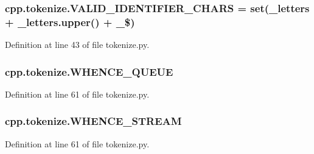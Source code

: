 \subsubsection[{\texorpdfstring{V\+A\+L\+I\+D\+\_\+\+I\+D\+E\+N\+T\+I\+F\+I\+E\+R\+\_\+\+C\+H\+A\+RS}{VALID_IDENTIFIER_CHARS}}]{\setlength{\rightskip}{0pt plus 5cm}cpp.\+tokenize.\+V\+A\+L\+I\+D\+\_\+\+I\+D\+E\+N\+T\+I\+F\+I\+E\+R\+\_\+\+C\+H\+A\+RS = set(\+\_\+letters + \+\_\+letters.\+upper() + \textquotesingle{}\+\_\$\textquotesingle{})}\hypertarget{namespacecpp_1_1tokenize_a733f1cf605b1630fb6a0a7f30aaefbec}{}\label{namespacecpp_1_1tokenize_a733f1cf605b1630fb6a0a7f30aaefbec}


Definition at line 43 of file tokenize.\+py.

\subsubsection[{\texorpdfstring{W\+H\+E\+N\+C\+E\+\_\+\+Q\+U\+E\+UE}{WHENCE_QUEUE}}]{\setlength{\rightskip}{0pt plus 5cm}cpp.\+tokenize.\+W\+H\+E\+N\+C\+E\+\_\+\+Q\+U\+E\+UE}\hypertarget{namespacecpp_1_1tokenize_ad02466a473c5e9c2ac256e18209f0967}{}\label{namespacecpp_1_1tokenize_ad02466a473c5e9c2ac256e18209f0967}


Definition at line 61 of file tokenize.\+py.

\subsubsection[{\texorpdfstring{W\+H\+E\+N\+C\+E\+\_\+\+S\+T\+R\+E\+AM}{WHENCE_STREAM}}]{\setlength{\rightskip}{0pt plus 5cm}cpp.\+tokenize.\+W\+H\+E\+N\+C\+E\+\_\+\+S\+T\+R\+E\+AM}\hypertarget{namespacecpp_1_1tokenize_a8dd117207e391864f7d9cb656e826a9e}{}\label{namespacecpp_1_1tokenize_a8dd117207e391864f7d9cb656e826a9e}


Definition at line 61 of file tokenize.\+py.

